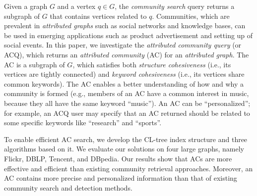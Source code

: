 Given a graph $G$ and a vertex $q \in G$, the {\it community search} query returns a subgraph of $G$ that contains vertices related to $q$. Communities, which are prevalent in {\it attributed graphs} such as social networks and knowledge bases, can be used in emerging applications such as product advertisement and setting up of social events.
In this paper, we investigate the {\it attributed community query} (or ACQ), which returns an {\it attributed community} (AC) for an {\it attributed graph}. The AC is a subgraph of $G$, which satisfies both {\it structure cohesiveness} (i.e., its vertices are tightly connected) and {\it keyword cohesiveness} (i.e., its vertices share common keywords).  The AC enables a better understanding of how and why a community is formed (e.g., members of an AC have a common interest in music, because they all have the same keyword ``music'').  An AC can be ``personalized''; for example, an ACQ user may specify that an AC returned should be related to some specific keywords like ``research'' and ``sports''.

To enable efficient AC search, we develop the CL-tree index structure and three algorithms based on it. We evaluate our solutions on four large graphs, namely Flickr, DBLP, Tencent, and DBpedia. Our results show that ACs are more effective and efficient than existing community retrieval approaches. Moreover, an AC contains more precise and personalized information than that of existing community search and detection methods.


%
%


